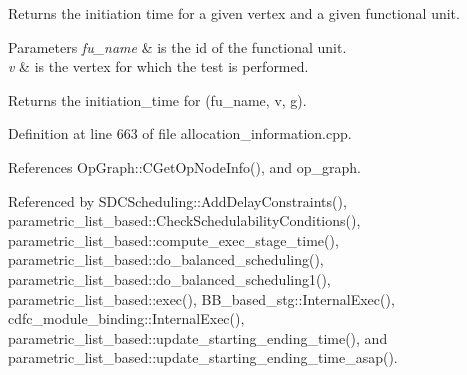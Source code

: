 Returns the initiation time for a given vertex and a given functional unit. 


\begin{DoxyParams}{Parameters}
{\em fu\+\_\+name} & is the id of the functional unit. \\
\hline
{\em v} & is the vertex for which the test is performed. \\
\hline
\end{DoxyParams}
\begin{DoxyReturn}{Returns}
the initiation\+\_\+time for (fu\+\_\+name, v, g). 
\end{DoxyReturn}


Definition at line 663 of file allocation\+\_\+information.\+cpp.



References Op\+Graph\+::\+C\+Get\+Op\+Node\+Info(), and op\+\_\+graph.



Referenced by S\+D\+C\+Scheduling\+::\+Add\+Delay\+Constraints(), parametric\+\_\+list\+\_\+based\+::\+Check\+Schedulability\+Conditions(), parametric\+\_\+list\+\_\+based\+::compute\+\_\+exec\+\_\+stage\+\_\+time(), parametric\+\_\+list\+\_\+based\+::do\+\_\+balanced\+\_\+scheduling(), parametric\+\_\+list\+\_\+based\+::do\+\_\+balanced\+\_\+scheduling1(), parametric\+\_\+list\+\_\+based\+::exec(), B\+B\+\_\+based\+\_\+stg\+::\+Internal\+Exec(), cdfc\+\_\+module\+\_\+binding\+::\+Internal\+Exec(), parametric\+\_\+list\+\_\+based\+::update\+\_\+starting\+\_\+ending\+\_\+time(), and parametric\+\_\+list\+\_\+based\+::update\+\_\+starting\+\_\+ending\+\_\+time\+\_\+asap().

